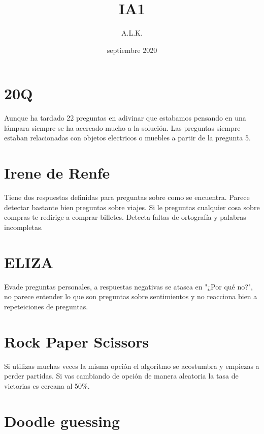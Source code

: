 \documentclass[twoside]{AiTeX}
\title{IA1}
\author{A.L.K.}
\date{septiembre 2020}
\begin{document}
\portadaApuntes
\pagestyle{empty}
\tableofcontents
\pagestyle{empty}
\justify


\section{20Q}

Aunque ha tardado 22 preguntas en adivinar que estabamos pensando en una lámpara siempre se ha acercado mucho a la solución.
Las preguntas siempre estaban relacionadas con objetos electricos o muebles a partir de la pregunta 5.

\section{Irene de Renfe}

Tiene dos respuestas definidas para preguntas sobre como se encuentra. Parece detectar bastante bien preguntas sobre viajes. Si le preguntas cualquier cosa sobre compras te redirige a comprar billetes. Detecta faltas de ortografía y palabras incompletas.

\section{ELIZA}

Evade preguntas personales, a respuestas negativas se atasca en "¿Por qué no?", no parece entender lo que son preguntas sobre sentimientos y no reacciona bien a repeteiciones de preguntas.

\section{Rock Paper Scissors}

Si utilizas muchas veces la misma opción el algoritmo se acostumbra y empiezas a perder partidas. Si vas cambiando de opción de manera aleatoria la tasa de victorias es cercana al 50\%.

\section{Doodle guessing}
\end{document}
